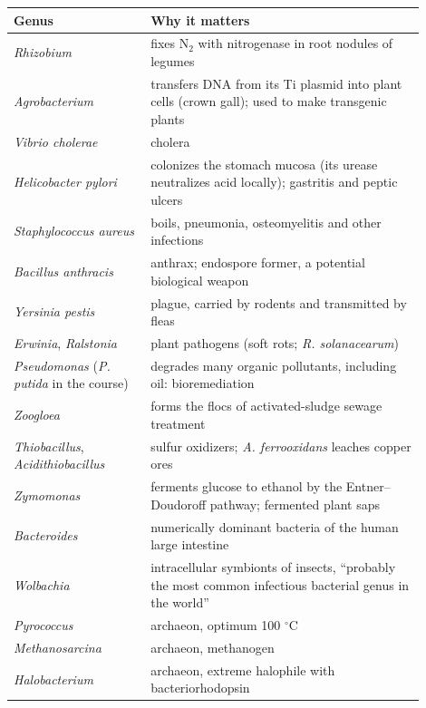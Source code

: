 \begin{center}
\begin{tabular}{p{0.3\linewidth}
p{0.6\linewidth}}
Genus & Why it matters \\
\hline
\emph{Rhizobium} & fixes $\mathrm{N_2}$ with
nitrogenase in root nodules of legumes
\cite[Section 25.3]{madigan2012brock} \\
\emph{Agrobacterium} & transfers DNA from its
Ti plasmid into plant cells (crown gall);
used to make transgenic plants \cite[Section
25.4]{madigan2012brock} \\
\emph{Vibrio cholerae} & cholera \\
\emph{Helicobacter pylori} & colonizes the
stomach mucosa (its urease neutralizes acid
locally); gastritis and peptic ulcers
\cite[Section 33.10]{madigan2012brock} \\
\emph{Staphylococcus aureus} & boils,
pneumonia, osteomyelitis and other infections
\cite[Chapter 18]{madigan2012brock} \\
\emph{Bacillus anthracis} & anthrax;
endospore former, a potential biological
weapon \cite[Chapter
11]{tortora2013microbiology} \\
\emph{Yersinia pestis} & plague, carried by
rodents and transmitted by fleas
\cite[Chapter 11]{tortora2013microbiology} \\
\emph{Erwinia}, \emph{Ralstonia} & plant
pathogens (soft rots; \emph{R. solanacearum})
\cite[Chapter 11]{tortora2013microbiology}
\cite[Section 17.7]{madigan2012brock} \\
\emph{Pseudomonas} (\emph{P. putida} in the
course) & degrades many organic pollutants,
including oil: bioremediation \cite[Chapter
2]{tortora2013microbiology} \\
\emph{Zoogloea} & forms the flocs of
activated-sludge sewage treatment
\cite[Chapter 11]{tortora2013microbiology} \\
\emph{Thiobacillus},
\emph{Acidithiobacillus} & sulfur oxidizers;
\emph{A. ferrooxidans} leaches copper ores
\cite[Section 24.7]{madigan2012brock} \\
\emph{Zymomonas} & ferments glucose to
ethanol by the Entner--Doudoroff pathway;
fermented plant saps \cite[Section
17.7]{madigan2012brock} \\
\emph{Bacteroides} & numerically dominant
bacteria of the human large intestine
\cite[Chapter 18]{madigan2012brock} \\
\emph{Wolbachia} & intracellular symbionts of
insects, ``probably the most common
infectious bacterial genus in the world''
\cite[Chapter 11]{tortora2013microbiology} \\
\emph{Pyrococcus} & archaeon, optimum 100
$^\circ$C \\
\emph{Methanosarcina} & archaeon, methanogen
\\
\emph{Halobacterium} & archaeon, extreme
halophile with bacteriorhodopsin \\
\end{tabular}
\end{center}

